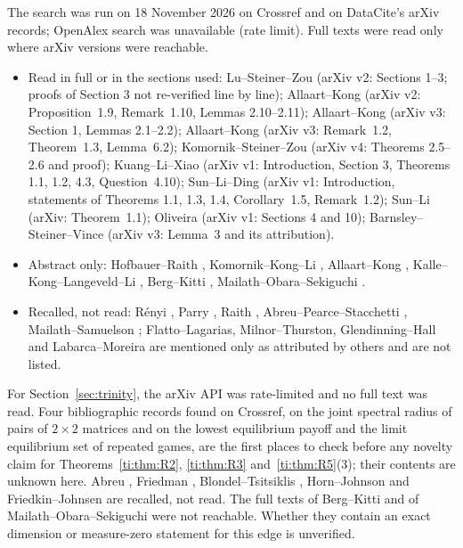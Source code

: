 \documentclass[11pt]{amsart}
\theoremstyle{remark}
\begin{document}
The search was run on 18 November 2026 on Crossref and on DataCite's arXiv records; OpenAlex search was unavailable (rate limit). Full texts were read only where arXiv versions were reachable.
\begin{itemize}
\item Read in full or in the sections used: Lu--Steiner--Zou \cite{LSZ} (arXiv v2: Sections 1--3; proofs of Section 3 not re-verified line by line); Allaart--Kong \cite{AKcrit} (arXiv v2: Proposition~1.9, Remark~1.10, Lemmas 2.10--2.11); Allaart--Kong \cite{AKplat} (arXiv v3: Section 1, Lemmas 2.1--2.2); Allaart--Kong \cite{AKgen} (arXiv v3: Remark~1.2, Theorem~1.3, Lemma~6.2); Komornik--Steiner--Zou \cite{KSZ} (arXiv v4: Theorems 2.5--2.6 and proof); Kuang--Li--Xiao \cite{KLX} (arXiv v1: Introduction, Section 3, Theorems 1.1, 1.2, 4.3, Question~4.10); Sun--Li--Ding \cite{SLD} (arXiv v1: Introduction, statements of Theorems 1.1, 1.3, 1.4, Corollary~1.5, Remark~1.2); Sun--Li \cite{SL} (arXiv: Theorem~1.1); Oliveira \cite{Oliveira} (arXiv v1: Sections 4 and 10); Barnsley--Steiner--Vince \cite{BSV} (arXiv v3: Lemma~3 and its attribution).
\item Abstract only: Hofbauer--Raith \cite{HR92}, Komornik--Kong--Li \cite{KKL17}, Allaart--Kong \cite{AK19}, Kalle--Kong--Langeveld--Li \cite{KKLL}, Berg--Kitti \cite{BK14}, Mailath--Obara--Sekiguchi \cite{MOS02}.
\item Recalled, not read: R\'enyi \cite{Renyi}, Parry \cite{Parry}, Raith \cite{Raith89}, Abreu--Pearce--Stacchetti \cite{APS90}, Mailath--Samuelson \cite{MS06}; Flatto--Lagarias, Milnor--Thurston, Glendinning--Hall and Labarca--Moreira are mentioned only as attributed by others and are not listed.
\end{itemize}
For Section~\ref{sec:trinity}, the arXiv API was rate-limited and no full text was read. Four bibliographic records found on Crossref, on the joint spectral radius of pairs of $2\times2$ matrices and on the lowest equilibrium payoff and the limit equilibrium set of repeated games, are the first places to check before any novelty claim for Theorems~\ref{ti:thm:R2}, \ref{ti:thm:R3} and~\ref{ti:thm:R5}(3); their contents are unknown here. Abreu \cite{Abreu88}, Friedman \cite{Friedman71}, Blondel--Tsitsiklis \cite{BT00}, Horn--Johnson \cite{HJ13} and Friedkin--Johnsen \cite{FJ99} are recalled, not read.
The full texts of Berg--Kitti and of Mailath--Obara--Sekiguchi were not reachable. Whether they contain an exact dimension or measure-zero statement for this edge is unverified.
\end{document}
